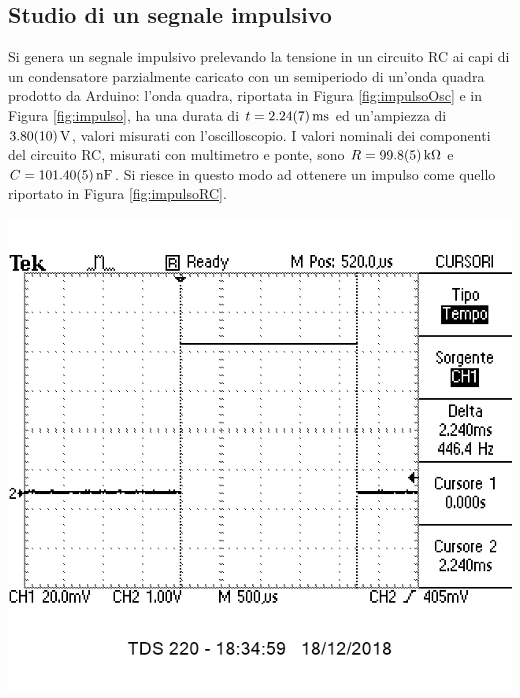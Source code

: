 \documentclass[10pt,oneside,a4paper]{article}
\newenvironment{Figure}
  {\par\medskip\noindent\minipage{\linewidth}}
  {\endminipage\par\medskip}
\begin{document}
\begin{multicols}{2}
\section{Studio di un segnale impulsivo}
Si genera un segnale impulsivo prelevando la tensione in un circuito RC ai capi di un condensatore parzialmente caricato con un semiperiodo di un'onda quadra prodotto da Arduino: l'onda quadra, riportata in Figura \ref{fig:impulsoOsc} e in Figura \ref{fig:impulso}, ha una durata di $t = \SI{2.24 \pm 0.07}{\milli\second}$ ed un'ampiezza di $\SI{3.80 \pm 0.1}{\volt}$, valori misurati con l'oscilloscopio.
I valori nominali dei componenti del circuito RC, misurati con multimetro e ponte, sono $R = \SI{99.8 \pm 0.5}{\kilo\ohm}$ e $C = \SI{101.40 \pm 0.05}{nF}$. Si riesce in questo modo ad ottenere un impulso come quello riportato in Figura \ref{fig:impulsoRC}.

\begin{Figure}
	\begin{center}
	\includegraphics[width=0.7\linewidth]{impulsoOsc}
	\label{fig:impulsoOsc}
	\end{center}
\end{Figure}


\end{multicols}
\end{document}
